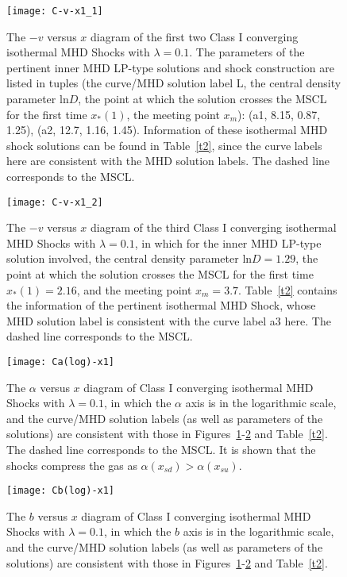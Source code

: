 \documentclass[fleqn,usenatbib]{mnras}
\begin{document}
\begin{figure}
\centering
\texttt{[image: C-v-x1\_1]}
\caption{The $-v$ versus $x$ diagram of the first two Class I converging isothermal MHD Shocks with $\lambda=0.1$. The parameters of the pertinent inner MHD LP-type solutions and shock construction are listed in tuples (the curve/MHD solution label L, the central density parameter $\mathrm{ln}D$, the point at which the solution crosses the MSCL for the first time $x_{*}(1)$, the meeting point $x_{m}$): (a1, 8.15, 0.87, 1.25), (a2, 12.7, 1.16, 1.45). Information of these isothermal MHD shock solutions can be found in Table~\ref{t2}, since the curve labels here are consistent with the MHD solution labels. The dashed line corresponds to the MSCL.}
\label{4}
\end{figure}

\begin{figure}
\centering
\texttt{[image: C-v-x1\_2]}
\caption{ 
The $-v$ versus $x$ diagram of the third Class I converging isothermal MHD Shocks with $\lambda=0.1$, in which for the inner MHD LP-type solution involved, the central density parameter $\mathrm{ln}D=1.29$, the point at which the solution crosses the MSCL for the first time $x_{*}(1)=2.16$, and the meeting point $x_{m}=3.7$. Table~\ref{t2} contains the information of the pertinent isothermal MHD Shock, whose MHD solution label is consistent with the curve label a3 here. The dashed line corresponds to the MSCL.}
\label{5}
\end{figure}

\begin{figure}
\centering
\texttt{[image: Ca(log)-x1]}
\caption{The $\alpha$ versus $x$ diagram of Class I converging isothermal MHD Shocks with $\lambda=0.1$, in which the $\alpha$ axis is in the logarithmic scale, and the curve/MHD solution labels (as well as parameters of the solutions) are consistent with those in Figures~\ref{4}-\ref{5} and Table~\ref{t2}. The dashed line corresponds to the MSCL. It is shown that the shocks compress the gas as $\alpha(x_{sd})>\alpha(x_{su})$.}
\label{6}
\end{figure}

\begin{figure}
\centering
\texttt{[image: Cb(log)-x1]}
\caption{The $b$ versus $x$ diagram of Class I converging isothermal MHD Shocks with $\lambda=0.1$, in which the $b$ axis is in the logarithmic scale, and the curve/MHD solution labels (as well as parameters of the solutions) are consistent with those in Figures~\ref{4}-\ref{5} and Table~\ref{t2}.}
\label{7}
\end{figure}
\end{document}
